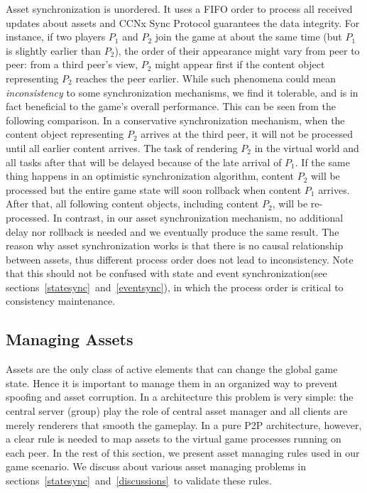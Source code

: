 Asset synchronization is unordered. It uses a FIFO order to process all received updates about assets and CCNx Sync Protocol guarantees the data integrity. For instance, if two players $P_1$ and $P_2$ join the game at about the same time (but $P_1$ is slightly earlier than $P_2$), the order of their appearance might vary from peer to peer: from a third peer's view, $P_2$ might appear first if the content object representing $P_2$ reaches the peer earlier. While such phenomena could mean \emph{inconsistency} to some synchronization mechanisms, we find it tolerable, and is in fact beneficial to the game's overall performance. This can be seen from the following comparison. In a conservative synchronization mechanism, when the content object representing $P_2$ arrives at the third peer, it will not be processed until all earlier content arrives. The task of rendering $P_2$ in the virtual world and all tasks after that will be delayed because of the late arrival of $P_1$. If the same thing happens in an optimistic synchronization algorithm, content $P_2$ will be processed but the entire game state will soon rollback when content $P_1$ arrives. After that, all following content objects, including content $P_2$, will be re-processed. In contrast, in our asset synchronization mechanism, no additional delay nor rollback is needed and we eventually produce the same result. The reason why asset synchronization works is that there is no causal relationship between assets, thus different process order does not lead to inconsistency. Note that this should not be confused with state and event synchronization(see sections~\ref{statesync}~and~\ref{eventsync}), in which the process order is critical to consistency maintenance.


\subsection{Managing Assets}
\label{manager}
Assets are the only class of active elements that can change the global game state. Hence it is important to manage them in an organized way to prevent spoofing and asset corruption. In a {\cs} architecture this problem is very simple: the central server (group) play the role of central asset manager and all clients are merely renderers that smooth the gameplay. In a pure P2P architecture, however, a clear rule is needed to map assets to the virtual game processes running on each peer. In the rest of this section, we present asset managing rules used in our game scenario. We discuss about various asset managing problems in sections~\ref{statesync}~and~\ref{discussions}~to validate these rules.

